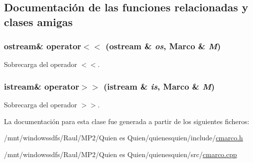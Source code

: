 \subsection{Documentación de las funciones relacionadas y clases amigas}
\hypertarget{class_marco_b75f27bde4e8a09c753f27a59aaf2da0}{
\subsubsection[{operator$<$$<$}]{\setlength{\rightskip}{0pt plus 5cm}ostream\& operator$<$$<$ (ostream \& {\em os}, \/  {\bf Marco} \& {\em M})}}
\label{class_marco_b75f27bde4e8a09c753f27a59aaf2da0}


Sobrecarga del operador $<$$<$. 

\hypertarget{class_marco_fab375685ea04cd0217fab909c6dedfb}{
\subsubsection[{operator$>$$>$}]{\setlength{\rightskip}{0pt plus 5cm}istream\& operator$>$$>$ (istream \& {\em is}, \/  {\bf Marco} \& {\em M})}}
\label{class_marco_fab375685ea04cd0217fab909c6dedfb}


Sobrecarga del operador $>$$>$. 



La documentación para esta clase fue generada a partir de los siguientes ficheros:\begin{CompactItemize}
\item 
/mnt/windowssdfs/Raul/MP2/Quien es Quien/quienesquien/include/\hyperlink{cmarco_8h}{cmarco.h}\item 
/mnt/windowssdfs/Raul/MP2/Quien es Quien/quienesquien/src/\hyperlink{cmarco_8cpp}{cmarco.cpp}\end{CompactItemize}
